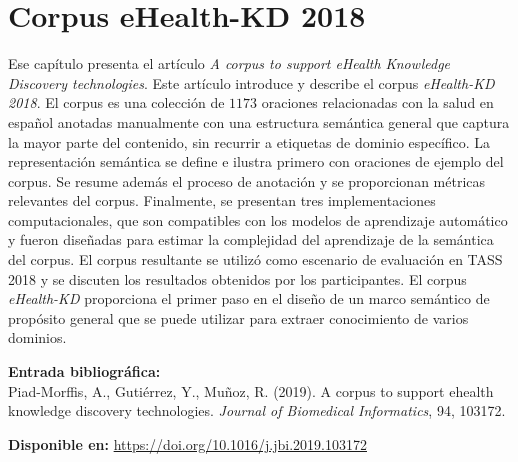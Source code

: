 
\chapter[Corpus eHealth-KD 2018: \textit{A corpus to support eHealth Knowledge Discovery technologies}]{Corpus eHealth-KD 2018}
\label{Chap:CorpusV1}

Ese capítulo presenta el artículo \textit{A corpus to support eHealth Knowledge Discovery technologies}.
Este artículo introduce y describe el corpus \textit{eHealth-KD 2018}. El corpus es una colección de $1173$ oraciones relacionadas con la salud en español anotadas manualmente con una estructura semántica general que captura la mayor parte del contenido, sin recurrir a etiquetas de dominio específico. La representación semántica se define e ilustra primero con oraciones de ejemplo del corpus. Se resume además el proceso de anotación y se proporcionan métricas relevantes del corpus. Finalmente, se presentan tres implementaciones computacionales, que son compatibles con los modelos de aprendizaje automático y fueron diseñadas para estimar la complejidad del aprendizaje de la semántica del corpus. El corpus resultante se utilizó como escenario de evaluación en TASS 2018 y se discuten los resultados obtenidos por los participantes. El corpus \textit{eHealth-KD} proporciona el primer paso en el diseño de un marco semántico de propósito general que se puede utilizar para extraer conocimiento de varios dominios.

\BlankLine
\noindent \textbf{Entrada bibliográfica:}\\
Piad-Morffis, A., Gutiérrez, Y., Muñoz, R. (2019). A corpus to support ehealth knowledge discovery technologies. \textit{Journal of Biomedical Informatics}, 94, 103172.

\BlankLine
\noindent \textbf{Disponible en:} \url{https://doi.org/10.1016/j.jbi.2019.103172}
